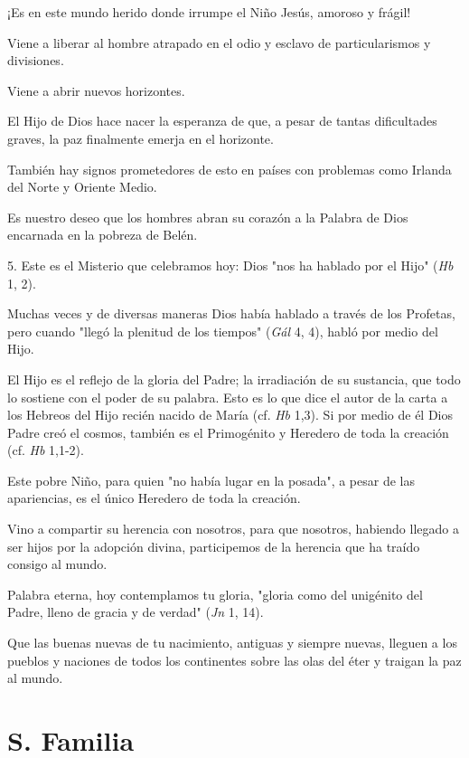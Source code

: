 ¡Es en este mundo herido donde irrumpe el Niño Jesús, amoroso y frágil!

Viene a liberar al hombre atrapado en el odio y esclavo de
particularismos y divisiones.

Viene a abrir nuevos horizontes.

El Hijo de Dios hace nacer la esperanza de que, a pesar de tantas
dificultades graves, la paz finalmente emerja en el horizonte.

También hay signos prometedores de esto en países con problemas como
Irlanda del Norte y Oriente Medio.

Es nuestro deseo que los hombres abran su corazón a la Palabra de Dios
encarnada en la pobreza de Belén.

5. Este es el Misterio que celebramos hoy: Dios "nos ha hablado por el
Hijo" (\emph{Hb} 1, 2).

Muchas veces y de diversas maneras Dios había hablado a través de los
Profetas, pero cuando "llegó la plenitud de los tiempos" (\emph{Gál} 4,
4), habló por medio del Hijo.

El Hijo es el reflejo de la gloria del Padre; la irradiación de su
sustancia, que todo lo sostiene con el poder de su palabra. Esto es lo
que dice el autor de la carta a los Hebreos del Hijo recién nacido de
María (cf. \emph{Hb} 1,3). Si por medio de él Dios Padre creó el cosmos,
también es el Primogénito y Heredero de toda la creación (cf. \emph{Hb}
1,1-2).

Este pobre Niño, para quien "no había lugar en la posada", a pesar de
las apariencias, es el único Heredero de toda la creación.

Vino a compartir su herencia con nosotros, para que nosotros, habiendo
llegado a ser hijos por la adopción divina, participemos de la herencia
que ha traído consigo al mundo.

Palabra eterna, hoy contemplamos tu gloria, "gloria como del unigénito
del Padre, lleno de gracia y de verdad" (\emph{Jn} 1, 14).

Que las buenas nuevas de tu nacimiento, antiguas y siempre nuevas,
lleguen a los pueblos y naciones de todos los continentes sobre las olas
del éter y traigan la paz al mundo.




\chapter{S. Familia}



